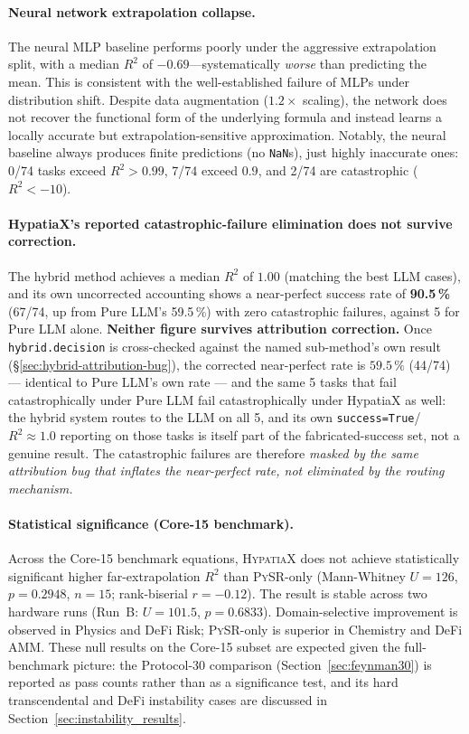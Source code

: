 \documentclass[twoside,11pt]{article}
\newcommand{\Rsq}{R^{2}}
\begin{document}
\paragraph{Neural network extrapolation collapse.}
The neural MLP baseline performs poorly under the aggressive extrapolation split,
with a median $\Rsq$ of $-0.69$---systematically \emph{worse} than predicting
the mean.  This is consistent with the well-established failure of MLPs under
distribution shift.  Despite data augmentation ($1.2\times$ scaling), the network
does not recover the functional form of the underlying formula and instead learns
a locally accurate but extrapolation-sensitive approximation.  Notably, the neural
baseline always produces finite predictions (no \texttt{NaN}s), just highly
inaccurate ones: 0/74 tasks exceed $\Rsq>0.99$, 7/74 exceed $0.9$, and 2/74 are
catastrophic ($\Rsq<-10$).

\paragraph{HypatiaX's reported catastrophic-failure elimination does not survive
correction.} The hybrid method achieves a median $\Rsq$ of $1.00$ (matching the
best LLM cases), and its own uncorrected accounting shows a near-perfect success
rate of \textbf{90.5\,\%} (67/74, up from Pure LLM's 59.5\,\%) with zero
catastrophic failures, against 5 for Pure LLM alone. \textbf{Neither figure
survives attribution correction.} Once \texttt{hybrid.decision} is
cross-checked against the named sub-method's own result
(\S\ref{sec:hybrid-attribution-bug}), the corrected near-perfect rate is
$59.5\,\%$ (44/74) --- identical to Pure LLM's own rate --- and the same 5
tasks that fail catastrophically under Pure LLM fail catastrophically under
HypatiaX as well: the hybrid system routes to the LLM on all 5, and its own
\texttt{success=True}/$\Rsq\approx 1.0$ reporting on those tasks is itself
part of the fabricated-success set, not a genuine result. The catastrophic
failures are therefore \emph{masked by the same attribution bug that
inflates the near-perfect rate, not eliminated by the routing mechanism.}

\paragraph{Statistical significance (Core-15 benchmark).}
Across the Core-15 benchmark equations, \textsc{HypatiaX} does not achieve
statistically significant higher far-extrapolation $\Rsq$ than \textsc{PySR}-only
(Mann-Whitney $U=126$, $p=0.2948$, $n=15$; rank-biserial $r=-0.12$).  The result
is stable across two hardware runs (Run~B: $U=101.5$, $p=0.6833$).
Domain-selective improvement is observed in Physics and DeFi Risk;
\textsc{PySR}-only is superior in Chemistry and DeFi AMM.
These null results on the Core-15 subset are expected given the full-benchmark
picture: the Protocol-30 comparison (Section~\ref{sec:feynman30}) is reported as pass counts
rather than as a significance test, and its hard transcendental and DeFi
instability cases are discussed in Section~\ref{sec:instability_results}.
\end{document}
